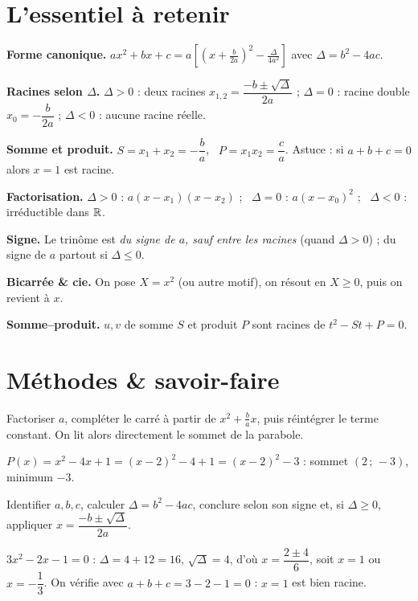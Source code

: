 \section{L'essentiel à retenir}

\begin{synthese}
\textbf{Forme canonique.} $ax^2+bx+c=a\!\left[\left(x+\frac{b}{2a}\right)^2-\frac{\Delta}{4a^2}\right]$
avec $\Delta=b^2-4ac$.

\smallskip
\textbf{Racines selon $\Delta$.}
$\Delta>0$ : deux racines $x_{1,2}=\dfrac{-b\pm\sqrt\Delta}{2a}$ ;
$\Delta=0$ : racine double $x_0=-\dfrac{b}{2a}$ ;
$\Delta<0$ : aucune racine réelle.

\smallskip
\textbf{Somme et produit.} $S=x_1+x_2=-\dfrac{b}{a}$, \ $P=x_1x_2=\dfrac{c}{a}$.
Astuce : si $a+b+c=0$ alors $x=1$ est racine.

\smallskip
\textbf{Factorisation.} $\Delta>0$ : $a(x-x_1)(x-x_2)$ ; \ $\Delta=0$ : $a(x-x_0)^2$ ;
\ $\Delta<0$ : irréductible dans $\mathbb{R}$.

\smallskip
\textbf{Signe.} Le trinôme est \emph{du signe de $a$, sauf entre les racines}
(quand $\Delta>0$) ; du signe de $a$ partout si $\Delta\le 0$.

\smallskip
\textbf{Bicarrée \& cie.} On pose $X=x^2$ (ou autre motif), on résout en $X\ge 0$,
puis on revient à $x$.

\smallskip
\textbf{Somme--produit.} $u,v$ de somme $S$ et produit $P$ sont racines de
$t^2-St+P=0$.
\end{synthese}

\section{Méthodes \& savoir-faire}

Factoriser $a$, compléter le carré à partir de $x^2+\frac{b}{a}x$, puis réintégrer
le terme constant. On lit alors directement le sommet de la parabole.
\begin{exemple}
$P(x)=x^2-4x+1=(x-2)^2-4+1=(x-2)^2-3$ : sommet $(2\,;\,-3)$, minimum $-3$.
\end{exemple}

Identifier $a,b,c$, calculer $\Delta=b^2-4ac$, conclure selon son signe et, si
$\Delta\ge 0$, appliquer $x=\dfrac{-b\pm\sqrt\Delta}{2a}$.
\begin{exemple}
$3x^2-2x-1=0$ : $\Delta=4+12=16$, $\sqrt\Delta=4$, d'où $x=\dfrac{2\pm 4}{6}$, soit
$x=1$ ou $x=-\dfrac{1}{3}$. On vérifie avec $a+b+c=3-2-1=0$ : $x=1$ est bien racine.
\end{exemple}

